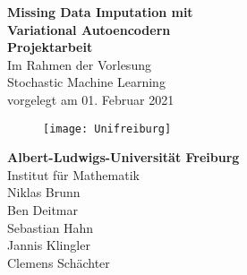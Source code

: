 \documentclass[12pt]{article}
\begin{document}
	\setlength{\parindent}{0em}
	\onehalfspacing
	\begin{titlepage}
		\begin{center}
			\huge\textbf{Missing Data Imputation mit \\Variational Autoencodern}\\
			\vspace{1.5cm}
			\LARGE\textbf{{Projektarbeit}}\\
			\vspace{0.5cm}
			\normalsize
			Im Rahmen der Vorlesung\\
			Stochastic Machine Learning\\
			\vspace{0.3cm}
			vorgelegt am 01. Februar 2021 \\
			\vspace{0.7cm}

			\begin{figure}[h!]
				\centering
				\texttt{[image: Unifreiburg]}
			\end{figure}

			\vspace{0.7cm}
			\large \textbf{Albert-Ludwigs-Universität Freiburg}\\
			\vspace{0.2cm}
			\large {Institut für Mathematik}\\
			\vspace{1cm}
			\large {Niklas Brunn}\\
			\large {Ben Deitmar}\\
			\large {Sebastian Hahn}\\
			\large {Jannis Klingler}\\
			\large {Clemens Schächter}\\

			\vspace{1.8cm}
		\end{center}
	\end{titlepage}

	\tableofcontents
	\newpage
\end{document}
